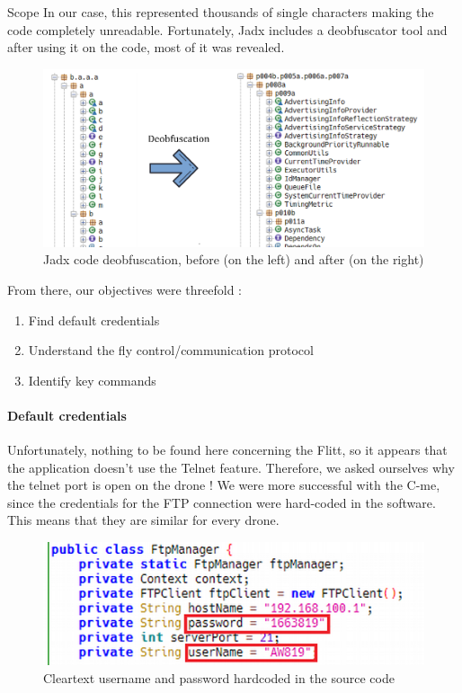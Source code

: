\begin{chaptercover}{Scope}
In our case, this represented thousands of single characters making the code completely unreadable. Fortunately, Jadx includes a deobfuscator tool and after using it on the code, most of it was revealed.

\begin{figure}[H]
  \centering
  \includegraphics[width=.8\linewidth]{figures/apk-source-deobfuscation}
  \caption{Jadx code deobfuscation, before (on the left) and after (on the right)}
\end{figure}

From there, our objectives were threefold :

\begin{enumerate}
  \item Find default credentials
  \item Understand the fly control/communication protocol
  \item Identify key commands
\end{enumerate}

\paragraph{Default credentials} Unfortunately, nothing to be found here concerning the Flitt, so it appears that the application doesn’t use the Telnet feature. Therefore, we asked ourselves why the telnet port is open on the drone ! We were more successful with the C-me, since the credentials for the FTP connection were hard-coded in the software. This means that they are similar for every drone.

\begin{figure}[H]
  \centering
  \includegraphics[width=.5\linewidth]{figures/apk-source-with-password}
  \caption{Cleartext username and password hardcoded in the source code}
\end{figure}


\end{chaptercover}

